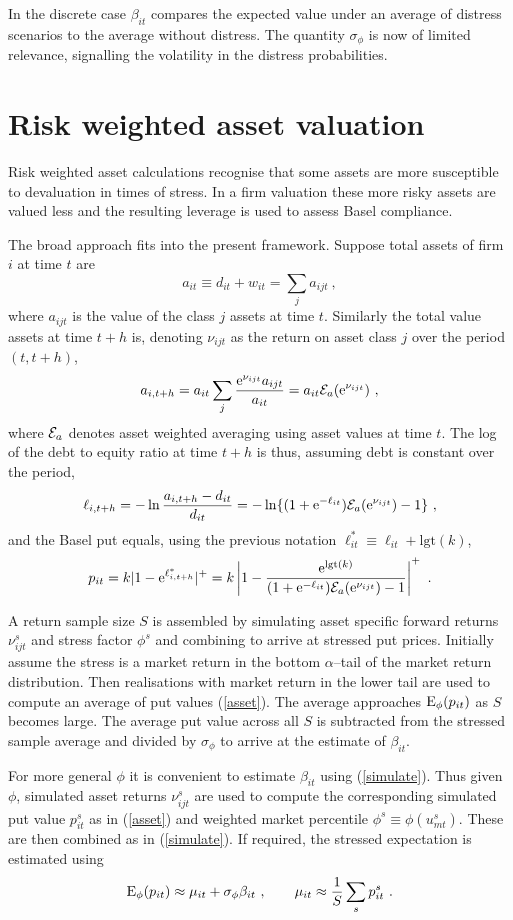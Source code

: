 \documentclass[authoryear]{elsarticle}
\newcommand{\logit}{\mathrm{lgt}}
\newcommand{\e}{\mathrm{e}}
\newcommand{\Ex}{{\cal E}}
\newcommand{\eref}[1]{(\ref{#1})}
\newcommand{\cq}{\ , \qquad}
\newcommand{\be}[1]{\begin{equation}\label{#1}}
\newcommand{\ee}{\end{equation}}
\begin{document}
In the discrete case $\beta_{it}$ compares the expected value under an average of distress scenarios to the average without distress.  The quantity $\sigma_\phi$ is now of limited relevance, signalling the volatility in the distress probabilities. 

   

\section{Risk weighted asset valuation}

Risk weighted asset calculations recognise that some assets are more susceptible to  devaluation in times of stress.  In a firm  valuation these more risky assets are  valued less and the  resulting leverage is used to assess Basel compliance.

The broad approach fits into the present framework.   Suppose total assets of firm $i$ at time $t$ are
$$
a_{it}\equiv d_{it}+w_{it}  = \sum_j a_{ijt} \ ,
$$
where  $a_{ijt}$ is the value of the class  $j$ assets at time $t$.   Similarly the total value assets at time $t+h$ is, denoting $\nu_{ijt}$ as the return on asset class $j$ over the period $(t,t+h)$, 
$$
 a_{i,t+h} = a_{it}\sum_j \frac{\e^{\nu_{ijt}}a_{ijt}}{a_{it}} = a_{it}\Ex_a(\e^{\nu_{ijt}})\ ,
$$
where $\Ex_a$ denotes asset weighted averaging using asset values at time $t$.
The log of the debt to equity ratio at time $t+h$ is thus, assuming debt is constant over the period,
$$
\ell_{i,t+h} = -\ln \frac{a_{i,t+h}-d_{it}}{d_{it}} = -\ln\{(1+\e^{-\ell_{it}})\Ex_a(\e^{\nu_{ijt}})-1\}\ ,
$$
and the Basel put equals, using the previous notation $\ell_{it}^*\equiv\ell_{it}+\logit(k)$,
\be{asset}
p_{it} = k|1-\e^{\ell^*_{i,t+h}}|^+ = k\left|1-\frac{\e^{\logit(k)}}{(1+\e^{-\ell_{it}})\Ex_a(\e^{\nu_{ijt}})-1}\right|^+ \ .
\ee

A return sample size $S$ is assembled by simulating asset specific forward returns $\nu^s_{ijt}$ and  stress factor $\phi^s$ and combining to arrive at stressed put prices.   Initially assume the stress  is a market return in the bottom $\alpha$--tail of the market return  distribution.   Then realisations with market return in the lower tail  are used to compute an average  of put values \eref{asset}.  The average approaches $\mathrm{E}_\phi(p_{it})$ as $S$ becomes large.   The average put value across all $S$ is  subtracted from the stressed sample average and divided by $\sigma_\phi$  to arrive at the estimate of $\beta_{it}$. 

For more general $\phi$ it is  convenient to estimate $\beta_{it}$ using \eref{simulate}.   Thus given $\phi$, simulated asset returns $\nu_{ijt}^s$ are used to compute the corresponding simulated put value $p_{it}^s$ as in \eref{asset} and weighted market percentile $\phi^s\equiv \phi(u^s_{mt})$.   These are then combined as in \eref{simulate}.   If required, the stressed expectation is estimated using 
$$
\Es(p_{it}) \approx \mu_{it} + \sigma_\phi\beta_{it}\cq \mu_{it} \approx \frac{1}{S}\sum_s p_{it}^s\ .
$$
\end{document}
